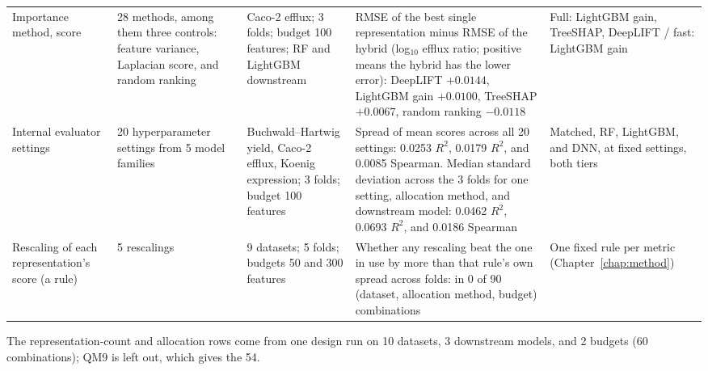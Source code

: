 {\begin{longtable}{@{}P{2.6cm}P{2.5cm}P{2.7cm}P{3.5cm}P{2.5cm}@{}}
\addlinespace
Importance method, score & 28 methods, among them three controls: feature variance, Laplacian score, and random ranking & Caco-2 efflux; 3 folds; budget 100 features; RF and LightGBM downstream & RMSE of the best single representation minus RMSE of the hybrid (log$_{10}$ efflux ratio; positive means the hybrid has the lower error): DeepLIFT $+0.0144$, LightGBM gain $+0.0100$, TreeSHAP $+0.0067$, random ranking $-0.0118$ & Full: LightGBM gain, TreeSHAP, DeepLIFT / fast: LightGBM gain \\
\addlinespace
Internal evaluator settings & 20 hyperparameter settings from 5 model families & Buchwald--Hartwig yield, Caco-2 efflux, Koenig expression; 3 folds; budget 100 features & Spread of mean scores across all 20 settings: 0.0253 $R^2$, 0.0179 $R^2$, and 0.0085 Spearman. Median standard deviation across the 3 folds for one setting, allocation method, and downstream model: 0.0462 $R^2$, 0.0693 $R^2$, and 0.0186 Spearman & Matched, RF, LightGBM, and DNN, at fixed settings, both tiers \\
\addlinespace
Rescaling of each representation's score (a rule) & 5 rescalings & 9 datasets; 5 folds; budgets 50 and 300 features & Whether any rescaling beat the one in use by more than that rule's own spread across folds: in 0 of 90 (dataset, allocation method, budget) combinations & One fixed rule per metric (Chapter~\ref{chap:method}) \\
\bottomrule
\end{longtable}
{\footnotesize The representation-count and allocation rows come from one design run on 10 datasets, 3 downstream models, and 2 budgets (60 combinations); QM9 is left out, which gives the 54.}
}

